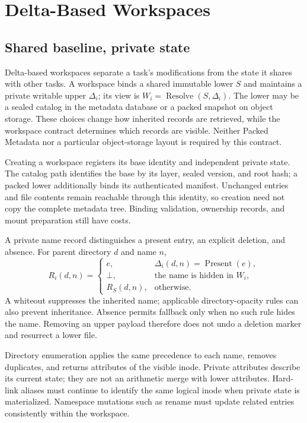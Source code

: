 \section{Delta-Based Workspaces}
\label{sec:delta}

\subsection{Shared baseline, private state}

Delta-based workspaces separate a task's modifications from the state it shares
with other tasks. A workspace binds a shared immutable lower $S$ and maintains
a private writable upper $\Delta_i$; its view is
$W_i=\operatorname{Resolve}(S,\Delta_i)$. The lower may be a sealed catalog in
the metadata database or a packed snapshot on object storage. These choices
change how inherited records are retrieved, while the workspace contract
determines which records are visible. Neither Packed Metadata nor a particular
object-storage layout is required by this contract.

Creating a workspace registers its base identity and independent private
state. The catalog path identifies the base by its layer, sealed version,
and root hash; a packed lower additionally binds its authenticated manifest.
Unchanged entries and file contents remain reachable through this identity,
so creation need not copy the complete metadata tree. Binding validation,
ownership records, and mount preparation still have costs.

A private name record distinguishes a present entry, an explicit deletion,
and absence. For parent directory $d$ and name $n$,
\begin{equation}
R_i(d,n)=
\begin{cases}
e, & \Delta_i(d,n)=\operatorname{Present}(e),\\
\bot, & \text{the name is hidden in }W_i,\\
R_S(d,n), & \text{otherwise}.
\end{cases}
\end{equation}
A whiteout suppresses the inherited name; applicable directory-opacity rules
can also prevent inheritance. Absence permits fallback only when no such rule
hides the name. Removing an upper payload therefore does not undo a deletion
marker and resurrect a lower file.

Directory enumeration applies the same precedence to each name, removes
duplicates, and returns attributes of the visible inode. Private attributes
describe its current state; they are not an arithmetic merge with lower
attributes. Hard-link aliases must continue to identify the same logical
inode when private state is materialized. Namespace mutations such as rename
must update related entries consistently within the workspace.

